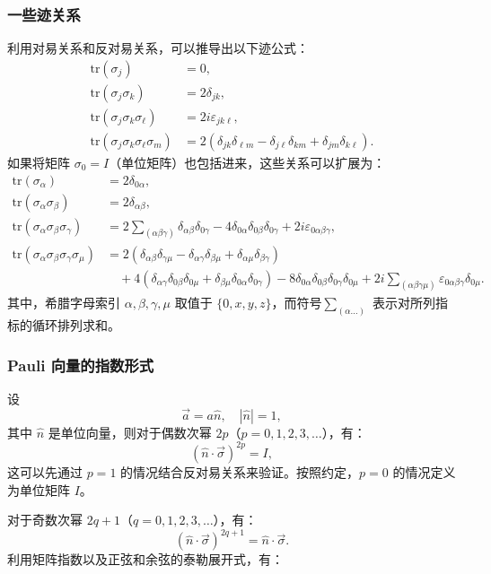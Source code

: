 \subsubsection{一些迹关系}
利用对易关系和反对易关系，可以推导出以下迹公式：
$$
\begin{aligned}
\mathrm{tr}(\sigma_j) &= 0,\\
\mathrm{tr}(\sigma_j \sigma_k) &= 2\delta_{jk},\\
\mathrm{tr}(\sigma_j \sigma_k \sigma_\ell) &= 2i\varepsilon_{jk\ell},\\
\mathrm{tr}(\sigma_j \sigma_k \sigma_\ell \sigma_m) &= 2(\delta_{jk}\delta_{\ell m} - \delta_{j\ell}\delta_{km} + \delta_{jm}\delta_{k\ell}).
\end{aligned}~
$$
如果将矩阵 $\sigma_0 = I$（单位矩阵）也包括进来，这些关系可以扩展为：
$$
\begin{aligned}
\mathrm{tr}(\sigma_\alpha) &= 2\delta_{0\alpha},\\
\mathrm{tr}(\sigma_\alpha \sigma_\beta) &= 2\delta_{\alpha\beta},\\
\mathrm{tr}(\sigma_\alpha \sigma_\beta \sigma_\gamma) &= 2\sum_{(\alpha\beta\gamma)} \delta_{\alpha\beta} \delta_{0\gamma} 
- 4\delta_{0\alpha}\delta_{0\beta}\delta_{0\gamma} 
+ 2i\varepsilon_{0\alpha\beta\gamma},\\
\mathrm{tr}(\sigma_\alpha \sigma_\beta \sigma_\gamma \sigma_\mu) &= 2(\delta_{\alpha\beta}\delta_{\gamma\mu} 
- \delta_{\alpha\gamma}\delta_{\beta\mu} 
+ \delta_{\alpha\mu}\delta_{\beta\gamma})\\
&\quad + 4(\delta_{\alpha\gamma}\delta_{0\beta}\delta_{0\mu} 
+ \delta_{\beta\mu}\delta_{0\alpha}\delta_{0\gamma}) 
- 8\delta_{0\alpha}\delta_{0\beta}\delta_{0\gamma}\delta_{0\mu} 
+ 2i\sum_{(\alpha\beta\gamma\mu)} \varepsilon_{0\alpha\beta\gamma} \delta_{0\mu}.
\end{aligned}~
$$
其中，希腊字母索引 $\alpha, \beta, \gamma, \mu$ 取值于 $\{0, x, y, z\}$，而符号$\sum_{(\alpha \ldots)}$ 表示对所列指标的循环排列求和。
\subsubsection{Pauli 向量的指数形式}
设
$$
\vec{a} = a \hat{n}, \quad |\hat{n}| = 1,~
$$
其中 $\hat{n}$ 是单位向量，则对于偶数次幂 $2p$（$p = 0, 1, 2, 3, \ldots$），有：
$$
(\hat{n} \cdot \vec{\sigma})^{2p} = I,~
$$
这可以先通过 $p = 1$ 的情况结合反对易关系来验证。按照约定，$p = 0$ 的情况定义为单位矩阵 $I$。

对于奇数次幂 $2q+1$（$q = 0, 1, 2, 3, \ldots$），有：
$$
(\hat{n} \cdot \vec{\sigma})^{2q+1} = \hat{n} \cdot \vec{\sigma}.~
$$
利用矩阵指数以及正弦和余弦的泰勒展开式，有：

